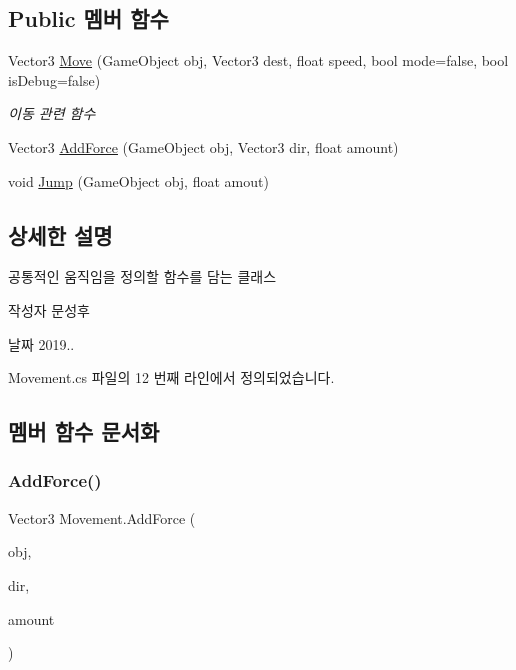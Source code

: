 \subsection*{Public 멤버 함수}
\begin{DoxyCompactItemize}
\item 
Vector3 \mbox{\hyperlink{class_movement_a5557f0e70e137025e19e406472daf36c}{Move}} (Game\+Object obj, Vector3 dest, float speed, bool mode=false, bool is\+Debug=false)
\begin{DoxyCompactList}\small\item\em 이동 관련 함수 \end{DoxyCompactList}\item 
Vector3 \mbox{\hyperlink{class_movement_aa1074ce9eb9afd5fc151f7da66c0a4d3}{Add\+Force}} (Game\+Object obj, Vector3 dir, float amount)
\item 
void \mbox{\hyperlink{class_movement_a26c05ac46da17f2f8999f1cce7fa49b8}{Jump}} (Game\+Object obj, float amout)
\end{DoxyCompactItemize}


\subsection{상세한 설명}
공통적인 움직임을 정의할 함수를 담는 클래스 

\begin{DoxyAuthor}{작성자}
문성후 
\end{DoxyAuthor}
\begin{DoxyDate}{날짜}
2019.. 
\end{DoxyDate}


Movement.\+cs 파일의 12 번째 라인에서 정의되었습니다.



\subsection{멤버 함수 문서화}
\mbox{\label{class_movement_aa1074ce9eb9afd5fc151f7da66c0a4d3}} 
\subsubsection{\texorpdfstring{AddForce()}{AddForce()}}
{\footnotesize\ttfamily Vector3 Movement.\+Add\+Force (\begin{DoxyParamCaption}\item[{Game\+Object}]{obj,  }\item[{Vector3}]{dir,  }\item[{float}]{amount }\end{DoxyParamCaption})}



